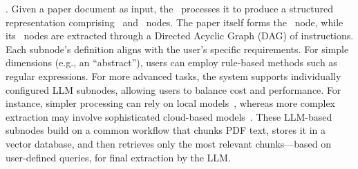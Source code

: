 . Given a paper document as input, the \inspector\ processes it to produce a structured representation comprising \fact\ and \dimension\ nodes. The paper itself forms the \fact\ node, while its \dimension\ nodes are extracted through a Directed Acyclic Graph (DAG) of instructions. %
Each subnode’s definition aligns with the user’s specific requirements. For simple dimensions (e.g., an ``abstract''), users can employ rule-based methods such as regular expressions. For more advanced tasks, the system supports individually configured LLM subnodes, allowing users to balance cost and performance. For instance, simpler processing can rely on local models~\cite{ollama}, whereas more complex extraction may involve sophisticated cloud-based models~\cite{gpt4o}. These LLM-based subnodes build on a common workflow that chunks PDF text, stores it in a vector database, and then retrieves only the most relevant chunks—based on user-defined queries, for final extraction by the LLM.

